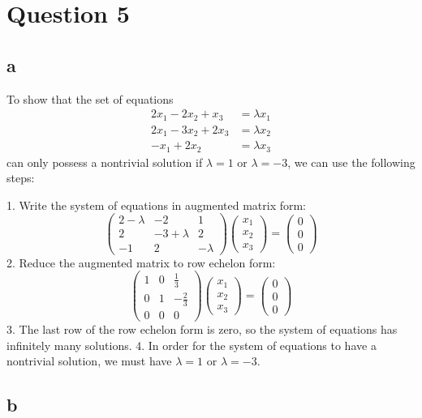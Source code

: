 \section{Question 5}
\subsection{a}


To show that the set of equations
\begin{align*}
2x_1 - 2x_2 + x_3 &= \lambda x_1 \\
2x_1 - 3x_2 + 2x_3 &= \lambda x_2 \\
-x_1 + 2x_2 &= \lambda x_3
\end{align*}can only possess a nontrivial solution if $\lambda = 1$ or $\lambda = -3$, we can use the following steps:

1. Write the system of equations in augmented matrix form:
\[\begin{pmatrix} 2-\lambda & -2 & 1 \\ 2 & -3+\lambda & 2 \\ -1 & 2 & -\lambda \end{pmatrix} \begin{pmatrix} x_1 \\ x_2 \\ x_3 \end{pmatrix} = \begin{pmatrix} 0 \\ 0 \\ 0 \end{pmatrix}\]
2. Reduce the augmented matrix to row echelon form:
\[\begin{pmatrix} 1 & 0 & \frac{1}{3} \\ 0 & 1 & -\frac{2}{3} \\ 0 & 0 & 0 \end{pmatrix} \begin{pmatrix} x_1 \\ x_2 \\ x_3 \end{pmatrix} = \begin{pmatrix} 0 \\ 0 \\ 0 \end{pmatrix}\]
3. The last row of the row echelon form is zero, so the system of equations has infinitely many solutions.
4. In order for the system of equations to have a nontrivial solution, we must have $\lambda = 1$ or $\lambda = -3$.

\subsection{b}

